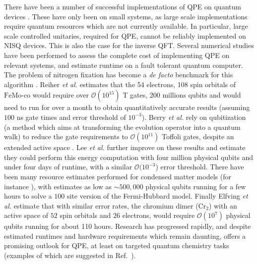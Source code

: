 There have been a number of successful implementations of QPE on quantum devices \cite{Du2010, Lanyon2010, Li2011, Wang2015, OMalley2016, Paesani2017, Santagati2018}. These have only been on small systems, as large scale implementations require quantum resources which are not currently available. In particular, large scale controlled unitaries, required for QPE, cannot be reliably implemented on NISQ devices. This is also the case for the inverse QFT. Several numerical studies have been performed to assess the complete cost of implementing QPE on relevant systems, and estimate runtime on a fault tolerant quantum computer. The problem of nitrogen fixation has become a \textit{de facto} benchmark for this algorithm \cite{Beinert1997}. Reiher \textit{et al.} \cite{reiherElucidatingReactionMechanisms2017} estimates that the 54 electrons, 108 spin orbitals of $\mathrm{FeMo}$-co would require over $\mathcal{O}(10^{15})$ T gates, 200 millions qubits and would need to run for over a month to obtain quantitatively accurate results (assuming $100$ ns gate times and error threshold of $10^{-3}$). Berry \textit{et al.} rely on qubitization (a method which aims at transforming the evolution operator into a quantum walk) \cite{Low2019} to reduce the gate requirements to $\mathcal{O}(10^{11})$ Toffoli gates, despite an extended active space \cite{Li2019}. Lee \textit{et al.} \cite{Lee2021} further improve on these results and estimate they could perform this energy computation with four million physical qubits and under four days of runtime, with a similar $\mathcal{O}(10^{-3}$) error threshold. There have been many resource estimates performed for condensed matter models (for instance \cite{Babbush2018_Ham_Sim, Kivlichan2020}), with estimates as low as $\sim 500,000$ physical qubits running for a few hours to solve a $100$ site version of the Fermi-Hubbard model. Finally Elfving \textit{et al.} \cite{Elfving2020} estimate that with similar error rates, the chromium dimer ($\mathrm{Cr_2}$) with an active space of $52$ spin orbitals and $26$ electrons, would require $\mathcal{O}(10^{7})$ physical qubits running for about 110 hours. Research has progressed rapidly, and despite estimated runtimes and hardware requirements which remain daunting, offers a promising outlook for QPE, at least on targeted quantum chemistry tasks (examples of which are suggested in Ref.~\cite{Elfving2020}). 

